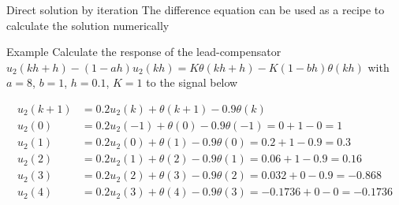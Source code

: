 \documentclass[presentation,aspectratio=1610]{beamer}
\begin{document}
\begin{frame}[label={sec:orgf0f2966}]{Direct solution by iteration}
The difference equation can be used as a recipe to calculate the solution numerically

\alert{Example} Calculate the response of the lead-compensator \(u_2(kh+h) - (1-ah)u_2(kh) = K\theta(kh+h) - K(1-bh)\theta(kh)\) with \(a=8\), \(b=1\), \(h=0.1\), \(K=1\)
to the signal below
\begin{center}
\end{center}
\begin{align*}
     u_2(k+1) &= 0.2u_2(k) + \theta(k+1) - 0.9\theta(k)\\
     u_2(0) &= 0.2u_2(-1) + \theta(0) - 0.9\theta(-1) = 0 + 1 -0 = 1\\
     u_2(1) &= 0.2u_2(0) + \theta(1) - 0.9\theta(0) = 0.2 + 1 - 0.9 = 0.3\\
     u_2(2) &= 0.2u_2(1) + \theta(2) - 0.9\theta(1) = 0.06 + 1 - 0.9 = 0.16\\
     u_2(3) &= 0.2u_2(2) + \theta(3) - 0.9\theta(2) = 0.032 + 0 - 0.9 = -0.868\\
     u_2(4) &= 0.2u_2(3) + \theta(4) - 0.9\theta(3) = -0.1736 + 0 - 0 = -0.1736\\
\end{align*}
\end{frame}
\end{document}
